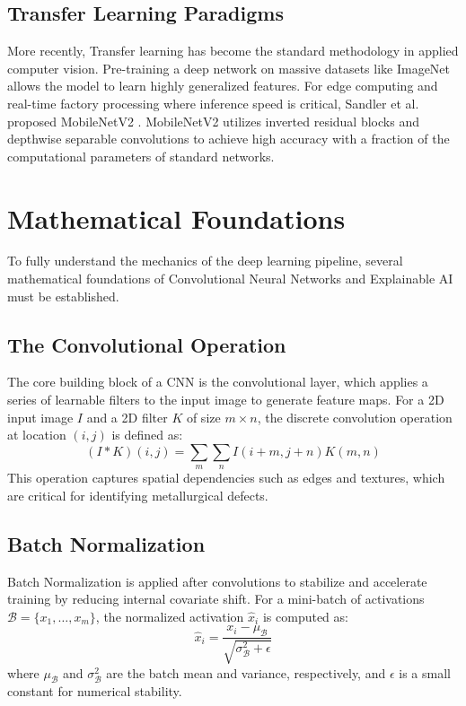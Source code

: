 \documentclass[conference, a4paper]{IEEEtran}
\begin{document}
\subsection{Transfer Learning Paradigms}
More recently, Transfer learning has become the standard methodology in applied computer vision. Pre-training a deep network on massive datasets like ImageNet allows the model to learn highly generalized features. For edge computing and real-time factory processing where inference speed is critical, Sandler et al. proposed MobileNetV2 \cite{sandler2018mobilenetv2}. MobileNetV2 utilizes inverted residual blocks and depthwise separable convolutions to achieve high accuracy with a fraction of the computational parameters of standard networks.

\section{Mathematical Foundations}
To fully understand the mechanics of the deep learning pipeline, several mathematical foundations of Convolutional Neural Networks and Explainable AI must be established.

\subsection{The Convolutional Operation}
The core building block of a CNN is the convolutional layer, which applies a series of learnable filters to the input image to generate feature maps. For a 2D input image $I$ and a 2D filter $K$ of size $m \times n$, the discrete convolution operation at location $(i, j)$ is defined as:
\begin{equation}
(I * K)(i,j) = \sum_{m} \sum_{n} I(i+m, j+n) K(m,n)
\end{equation}
This operation captures spatial dependencies such as edges and textures, which are critical for identifying metallurgical defects.

\subsection{Batch Normalization}
Batch Normalization is applied after convolutions to stabilize and accelerate training by reducing internal covariate shift. For a mini-batch of activations $\mathcal{B} = \{x_{1}, \dots, x_{m}\}$, the normalized activation $\hat{x}_i$ is computed as:
\begin{equation}
\hat{x}_i = \frac{x_i - \mu_{\mathcal{B}}}{\sqrt{\sigma_{\mathcal{B}}^2 + \epsilon}}
\end{equation}
where $\mu_{\mathcal{B}}$ and $\sigma_{\mathcal{B}}^2$ are the batch mean and variance, respectively, and $\epsilon$ is a small constant for numerical stability.
\end{document}
